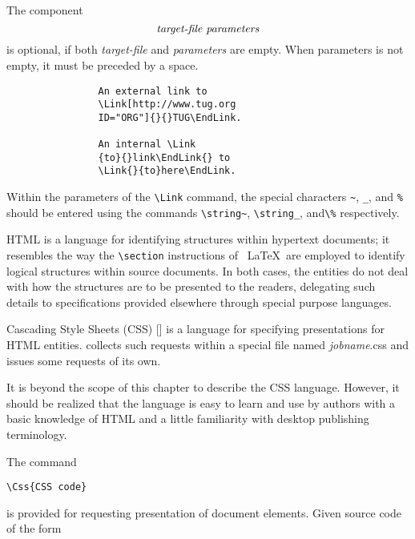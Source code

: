 The component \[\emph{target-file parameters}\] is optional, if both
\emph{target-file} and \emph{parameters} are empty. When parameters is not
empty, it must be preceded by a space. 

\begin{verbatim}
                An external link to 
                \Link[http://www.tug.org 
                ID="ORG"]{}{}TUG\EndLink. 

                An internal \Link 
                {to}{}link\EndLink{} to 
                \Link{}{to}here\EndLink. 
\end{verbatim}

Within the parameters of the \verb|\Link| command, the special characters
\verb|~|, \verb|_|, and \verb|%| should be entered using the commands
\verb|\string~|, \verb|\string_|, and\verb|\%| respectively. 


HTML is a language for identifying structures within hypertext
documents; it resembles the way the \verb|\section| instructions of \
\LaTeX\  are employed to identify logical structures within source
documents. In both cases, the entities do not deal with how the
structures are to be presented to the readers, delegating such details
to specifications provided elsewhere through special purpose languages. 

Cascading Style Sheets (CSS) [] is a language for specifying
presentations for HTML entities. \texht collects such requests within a
special file named \hbox{\emph{jobname}.css} and issues some requests of
its own. 

It is beyond the scope of this chapter to describe the CSS language. However, it 
should be realized that the language is easy to learn and use by authors with a basic 
knowledge of HTML and a little familiarity with desktop publishing terminology. 


The command 

\begin{verbatim}
\Css{CSS code} 
\end{verbatim}

is provided for requesting presentation of document elements.  Given
source code of the form 

